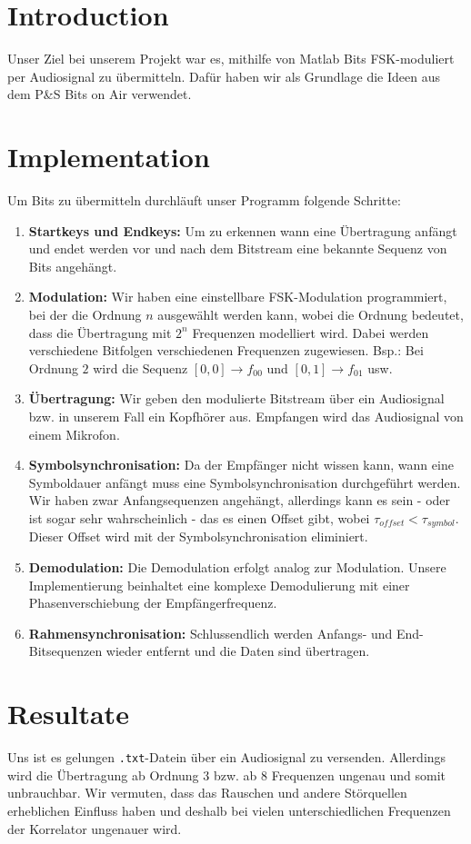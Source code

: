 \documentclass[11pt]{article}
\begin{document}
\section*{Introduction}
Unser Ziel bei unserem Projekt war es, mithilfe von Matlab Bits FSK-moduliert per Audiosignal zu \"ubermitteln. Daf\"ur haben wir als Grundlage die Ideen aus dem P\&S Bits on Air verwendet.
\section*{Implementation}
Um Bits zu \"ubermitteln durchl\"auft unser Programm folgende Schritte:
\begin{enumerate}

\item \textbf{Startkeys und Endkeys:} Um zu erkennen wann eine \"Ubertragung anf\"angt und endet werden vor und nach dem Bitstream eine bekannte Sequenz von Bits angeh\"angt. 
\item \textbf{Modulation:} Wir haben eine einstellbare FSK-Modulation programmiert, bei der die Ordnung $n$ ausgew\"ahlt werden kann, wobei die Ordnung bedeutet, dass die \"Ubertragung mit $2^n$ Frequenzen modelliert wird. Dabei werden verschiedene Bitfolgen verschiedenen Frequenzen zugewiesen. Bsp.: Bei Ordnung $2$ wird die Sequenz $[0,0] \rightarrow f_{00}$ und $[0,1] \rightarrow f_{01}$ usw.
\item \textbf{\"Ubertragung:} Wir geben den modulierte Bitstream \"uber ein Audiosignal bzw. in unserem Fall ein Kopfh\"orer aus. Empfangen wird das Audiosignal von einem Mikrofon.
\item \textbf{Symbolsynchronisation:} Da der Empf\"anger nicht wissen kann, wann eine Symboldauer anf\"angt muss eine Symbolsynchronisation durchgef\"uhrt werden. Wir haben zwar Anfangsequenzen angeh\"angt, allerdings kann es sein - oder ist sogar sehr wahrscheinlich - das es einen Offset gibt, wobei $\tau_{offset} < \tau_{symbol}$. Dieser Offset wird mit der Symbolsynchronisation eliminiert.
\item \textbf{Demodulation:} Die Demodulation erfolgt analog zur Modulation. Unsere Implementierung beinhaltet eine komplexe Demodulierung mit einer Phasenverschiebung der Empf\"angerfrequenz.
\item \textbf{Rahmensynchronisation:} Schlussendlich werden Anfangs- und End-Bitsequenzen wieder entfernt und die Daten sind \"ubertragen.
\end{enumerate}

\section*{Resultate}
Uns ist es gelungen \texttt{.txt}-Datein \"uber ein Audiosignal zu versenden. Allerdings wird die \"Ubertragung ab Ordnung $3$ bzw. ab 8 Frequenzen ungenau und somit unbrauchbar. Wir vermuten, dass das Rauschen und andere St\"orquellen erheblichen Einfluss haben und deshalb bei vielen unterschiedlichen Frequenzen der Korrelator ungenauer wird.
\end{document}

